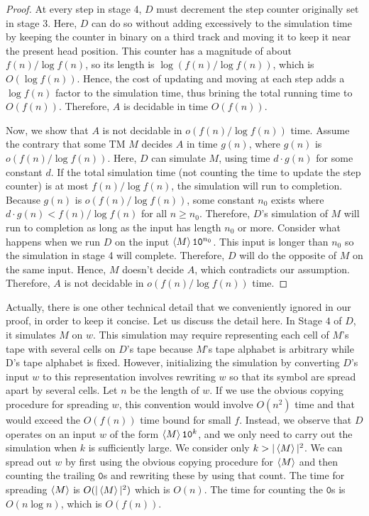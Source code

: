 \documentclass[11pt,twoside=off,numbers=noenddot]{scrbook}
\begin{document}
\begin{proof}
  At every step in stage 4, $D$ must decrement the step counter originally set in stage 3. Here, $D$ can do so without adding excessively to the simulation time by keeping the counter in binary on a third track and moving it to keep it near the present head position. This counter has a magnitude of about $f(n) / \log f(n)$, so its length is $\log(f(n) / \log f(n))$, which is $O(\log f(n))$. Hence, the cost of updating and moving at each step adds a $\log f(n)$ factor to the simulation time, thus brining the total running time to $O(f(n))$. Therefore, $A$ is decidable in time $O(f(n))$.

  Now, we show that $A$ is not decidable in $o(f(n) / \log f(n))$ time. Assume the contrary that some TM $M$ decides $A$ in time $g(n)$, where $g(n)$ is $o(f(n) / \log f(n))$. Here, $D$ can simulate $M$, using time $d \cdot g(n)$ for some constant $d$. If the total simulation time (not counting the time to update the step counter) is at most $f(n) / \log f(n)$, the simulation will run to completion. Because $g(n)$ is $o(f(n) / \log f(n))$, some constant $n_0$ exists where $d \cdot g(n) < f(n) / \log f(n)$ for all $n \geq n_0$. Therefore, $D$'s simulation of $M$ will run to completion as long as the input has length $n_0$ or more. Consider what happens when we run $D$ on the input $\left< M \right>\texttt{1}\texttt{0}^{n_0}$. This input is longer than $n_0$ so the simulation in stage 4 will complete. Therefore, $D$ will do the opposite of $M$ on the same input. Hence, $M$ doesn't decide $A$, which contradicts our assumption. Therefore, $A$ is not decidable in $o(f(n) / \log f(n))$ time.
\end{proof}

\begin{remark}
  Actually, there is one other technical detail that we conveniently ignored in our proof, in order to keep it concise. Let us discuss the detail here. In Stage $4$ of $D$, it simulates $M$ on $w$. This simulation may require representing each cell of $M$'s tape with several cells on $D$'s tape because $M$'s tape alphabet is arbitrary while D's tape alphabet is fixed. However, initializing the simulation by converting $D$'s input $w$ to this representation involves rewriting $w$ so that its symbol are spread apart by several cells. Let $n$ be the length of $w$. If we use the obvious copying procedure for spreading $w$, this convention would involve $O(n^2)$ time and that would exceed the $O(f(n))$ time bound for small $f$. Instead, we observe that $D$ operates on an input $w$ of the form $\left< M \right>\texttt{1}\texttt{0}^k$, and we only need to carry out the simulation when $k$ is sufficiently large. We consider only $k > | \left< M \right> |^2$. We can spread out $w$ by first using the obvious copying procedure for $\left< M \right>$ and then counting the trailing $\texttt{0}$s and rewriting these by using that count. The time for spreading $\left< M \right>$ is $O(| \left< M \right> |^2)$ which is $O(n)$. The time for counting the $\texttt{0}$s is $O(n \log n)$, which is $O(f(n))$.
\end{remark}
\end{document}
